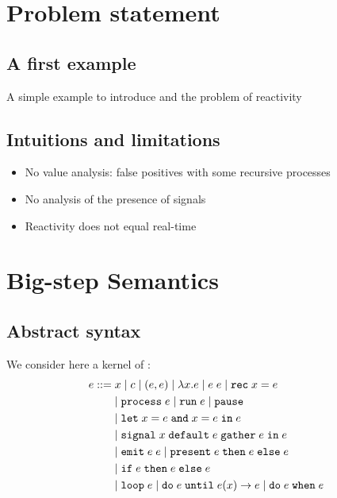 \documentclass[9pt,preprint]{sigplanconf}
\newcommand{\sdeq}{::=}
\begin{document}
\section{Problem statement}

\subsection{A first example}

A simple example to introduce \rml{} and the problem of reactivity

\subsection{Intuitions and limitations}

\begin{itemize}
\item No value analysis: false positives with some recursive processes
\item No analysis of the presence of signals
\item Reactivity does not equal real-time
\end{itemize}

\section{Big-step Semantics}

\subsection{Abstract syntax}

We consider here a kernel of \rml{}:
%
\begin{align*}
e \sdeq &\phantom{\mid}  x \mid c \mid (e, e) \mid \elam{x}{e} 
  \mid \eapp{e}{e} \mid \erec{x}{e} \\
  & \mid \eproc{e} \mid \erun{e} \mid \epause{}  \\
& \mid \eletpar{x}{e}{x}{e}{e} \\
 &\mid \esig{x}{e}{e}{e} \\
 & \mid \eemit{e}{e} \mid \epres{e}{e}{e} \\
 & \mid \eite{e}{e}{e} \\
 &  \mid \eloop{e} \mid \euntil{e}{e}{x}{e} 
   \mid \ewhen{e}{e} 
\end{align*}
\end{document}
